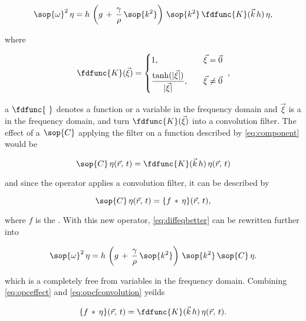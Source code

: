 \begin{equation} \label{eq:diffeqbetter}
\sop{\omega}^2\,\eta = h\,\left(g\,+\,\frac{\gamma}{\rho}\,\sop{k^2}\right)\,\sop{k^2}\,\fdfunc{K}(\vec{k}\,h)\,\eta,
\end{equation}

where

\begin{equation} \label{eq:transkernelofxivec}
\fdfunc{K}(\vec{\xi}) = \begin{cases}
1                                                  , & \quad \vec{\xi} = \vec{0} \\[.5em]
\displaystyle\frac{\tanh(|\vec{\xi}|)}{|\vec{\xi}|}, & \quad \vec{\xi} \neq \vec{0}
\end{cases}\ ,
\end{equation}

a $\fdfunc{\ }$ denotes a function or a variable in the frequency domain and $\vec{\xi}$ is a  in the frequency domain, and turn $\fdfunc{K}(\vec{\xi})$ into a convolution filter. The effect of a  $\sop{C}$ applying the filter on a function described by \eqref{eq:component} would be

\begin{equation} \label{eq:opceffect}
\sop{C}\,\eta(\vec{r},\,t) = \fdfunc{K}(\vec{k}\,h)\,\eta(\vec{r},\,t)
\end{equation}

and since the operator applies a convolution filter, it can be described by

\begin{equation} \label{eq:opcfconvolution}
\sop{C}\,\eta(\vec{r},\,t) = \{f\,*\,\eta\}(\vec{r},\,t),
\end{equation}

where $f$ is the . With this new operator, \eqref{eq:diffeqbetter} can be rewritten further into

\begin{equation} \label{eq:diffeqspatial}
\sop{\omega}^2\,\eta = h\,\left(g\,+\,\frac{\gamma}{\rho}\,\sop{k^2}\right)\,\sop{k^2}\,\sop{C}\,\eta.
\end{equation}

which is a \PDE completely free from variables in the frequency domain. Combining \eqref{eq:opceffect} and \eqref{eq:opcfconvolution} yeilds

\begin{equation} \label{eq:fconvolutioneffect}
\{f\,*\,\eta\}(\vec{r},\,t) = \fdfunc{K}(\vec{k}\,h)\,\eta(\vec{r},\,t).
\end{equation}

